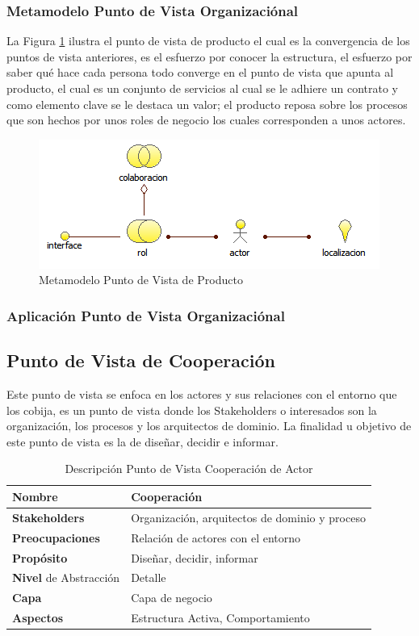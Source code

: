       \subsubsection{Metamodelo Punto de Vista Organizaciónal}
      La Figura \ref{metamodelo6} ilustra el punto de vista de producto el cual es la convergencia de los puntos de vista anteriores, es el esfuerzo por conocer la estructura, el esfuerzo por saber qué hace cada persona todo converge en el punto de vista que apunta al producto, el cual es un conjunto de servicios al cual se le adhiere un contrato y como elemento clave se le destaca un valor; el producto reposa sobre los procesos que son hechos por unos roles de negocio los cuales corresponden a unos actores. \cite{ref9}
  \begin{figure}[h]
	\centering
	\includegraphics{Imagenes/Metamodelos/01.png}
	\caption{Metamodelo Punto de Vista de Producto \cite{ref9}}
	\label{metamodelo6}
  \end{figure}
      \subsubsection{Aplicación Punto de Vista Organizaciónal}
      \subsection{Punto de Vista de Cooperación}
      Este punto de vista se enfoca en los actores y sus relaciones con el entorno que los cobija, es un punto de vista donde los Stakeholders o interesados son la organización, los procesos y los arquitectos de dominio. La finalidad u objetivo de este punto de vista es la de diseñar, decidir e informar. \cite{ref9}

      \begin{table}[h]
      	\centering
      	\begin{tabular}{p{3.7cm}p{8cm}}
      		\hline
      		\textbf{Nombre} & \textbf{Cooperación} \\
      		\hline
      		\textbf{Stakeholders} & Organización, arquitectos de dominio y proceso \\
      		\textbf{Preocupaciones} & Relación de actores con el entorno \\
      		\textbf{Propósito} & Diseñar, decidir, informar \\
      		\textbf{Nivel} de Abstracción & Detalle \\
      		\textbf{Capa} & Capa de negocio \\
      		\textbf{Aspectos} & Estructura Activa, Comportamiento \\
      	\end{tabular}
      	\caption{Descripción Punto de Vista Cooperación de Actor \cite{ref9}}
      	\label{tabla5}
      \end{table}


